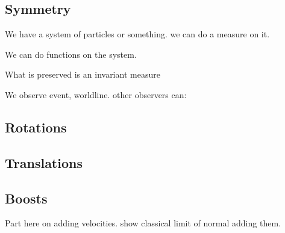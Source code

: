 


\subsection{Symmetry}
We have a system of particles or something. we can do a measure on it.

We can do functions on the system.

What is preserved is an invariant measure


We observe event, worldline. other observers can:

\subsection{Rotations}

\subsection{Translations}

\subsection{Boosts}
Part here on adding velocities. show classical limit of normal adding them.

